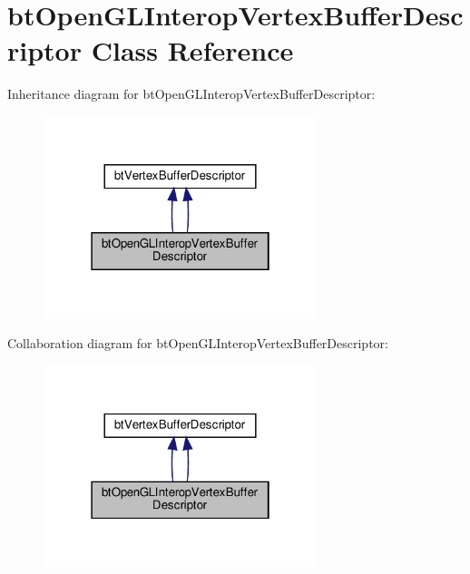 \hypertarget{classbtOpenGLInteropVertexBufferDescriptor}{}\section{bt\+Open\+G\+L\+Interop\+Vertex\+Buffer\+Descriptor Class Reference}
\label{classbtOpenGLInteropVertexBufferDescriptor}


Inheritance diagram for bt\+Open\+G\+L\+Interop\+Vertex\+Buffer\+Descriptor\+:
\nopagebreak
\begin{figure}[H]
\begin{center}
\leavevmode
\includegraphics[width=226pt]{classbtOpenGLInteropVertexBufferDescriptor__inherit__graph}
\end{center}
\end{figure}


Collaboration diagram for bt\+Open\+G\+L\+Interop\+Vertex\+Buffer\+Descriptor\+:
\nopagebreak
\begin{figure}[H]
\begin{center}
\leavevmode
\includegraphics[width=226pt]{classbtOpenGLInteropVertexBufferDescriptor__coll__graph}
\end{center}
\end{figure}
